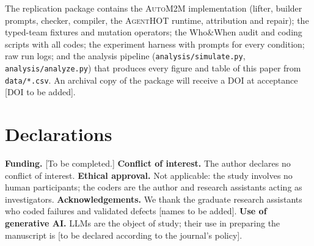 \documentclass[pdflatex,sn-mathphys-num]{sn-jnl}
\theoremstyle{thmstyleone}%
\theoremstyle{thmstyletwo}%
\theoremstyle{thmstylethree}%
\newcommand{\tool}{\textsc{AgentHOT}}
\newcommand{\auto}{\textsc{AutoM2M}}
\begin{document}
The replication package contains the \auto{} implementation (lifter, builder
prompts, checker, compiler, the \tool{} runtime, attribution and repair); the
typed-team fixtures and mutation operators; the Who\&When audit and coding
scripts with all codes; the experiment harness with prompts for every
condition; raw run logs; and the analysis pipeline (\texttt{analysis/simulate.py},
\texttt{analysis/analyze.py}) that produces every figure and table of this
paper from \texttt{data/*.csv}. An archival copy of
the package will receive a DOI at acceptance [DOI to be added].

\section*{Declarations}

\textbf{Funding.} [To be completed.]
\textbf{Conflict of interest.} The author declares no conflict of interest.
\textbf{Ethical approval.} Not applicable: the study involves no human
participants; the coders are the author and research assistants acting as
investigators.
\textbf{Acknowledgements.} We thank the graduate research assistants who
coded failures and validated defects [names to be added].
\textbf{Use of generative AI.} LLMs are the object of study; their use in
preparing the manuscript is [to be declared according to the journal's
policy].



\end{document}
